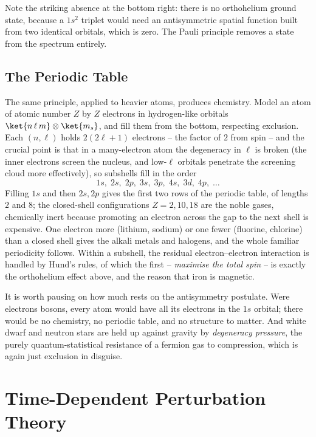 Note the striking absence at the bottom right: there is no orthohelium ground state, because a $1s^2$ triplet would need an antisymmetric spatial function built from two identical orbitals, which is zero. The Pauli principle removes a state from the spectrum entirely.

\subsection{The Periodic Table}

The same principle, applied to heavier atoms, produces chemistry. Model an atom of atomic number $Z$ by $Z$ electrons in hydrogen-like orbitals $\ket{n\,\ell\,m}\otimes\ket{m_s}$, and fill them from the bottom, respecting exclusion. Each $(n,\ell)$  holds $2(2\ell+1)$ electrons -- the factor of $2$ from spin -- and the crucial point is that in a many-electron atom the degeneracy in $\ell$ is broken (the inner electrons screen the nucleus, and low-$\ell$ orbitals penetrate the screening cloud more effectively), so subshells fill in the order
$$
1s,\; 2s,\; 2p,\; 3s,\; 3p,\; 4s,\; 3d,\; 4p,\; \dots
$$
Filling $1s$ and then $2s, 2p$ gives the first two rows of the periodic table, of lengths $2$ and $8$; the closed-shell configurations $Z = 2, 10, 18$ are the noble gases, chemically inert because promoting an electron across the gap to the next shell is expensive. One electron more (lithium, sodium) or one fewer (fluorine, chlorine) than a closed shell gives the alkali metals and halogens, and the whole familiar periodicity follows. Within a subshell, the residual electron--electron interaction is handled by Hund's rules, of which the first -- \emph{maximise the total spin} -- is exactly the orthohelium effect above, and the reason that iron is magnetic.

\begin{remark}
    It is worth pausing on how much rests on the antisymmetry postulate. Were electrons bosons, every atom would have all its electrons in the $1s$ orbital; there would be no chemistry, no periodic table, and no structure to matter. And white dwarf and neutron stars are held up against gravity by \emph{degeneracy pressure}, the purely quantum-statistical resistance of a fermion gas to compression, which is again just exclusion in disguise.
\end{remark}

\section{Time-Dependent Perturbation Theory}\label{sec:tdpt}

